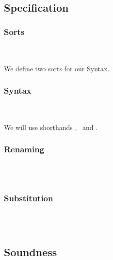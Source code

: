 \subsection{Specification}
\subsubsection{Sorts}\hfill\\\\
We define two sorts for our Syntax. 
\FSorts
\subsubsection{Syntax}\hfill\\\\
\FSyntax
We will use shorthands \FVar, \FExpr\ and \FType.
\subsubsection{Renaming}\hfill\\\\
\FRenaming
\FRenamings
\FRename
\subsubsection{Substitution}\hfill\\\\
\FSubstitution
\FSubstitutions
\FSubstitute
\subsection{Soundness}
